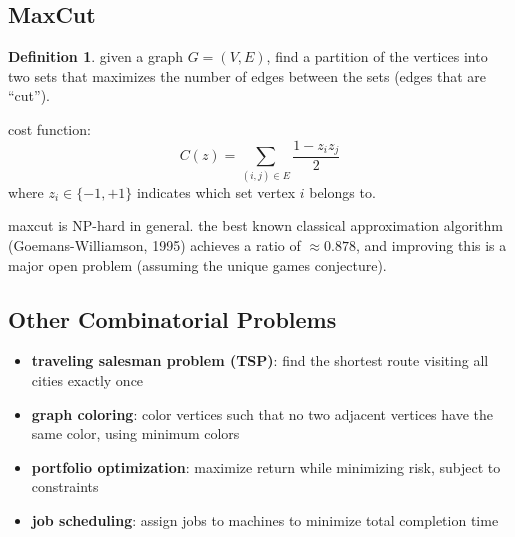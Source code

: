 \documentclass[11pt,a4paper]{article}
\theoremstyle{definition}
\newtheorem{definition}{Definition}[section]
\theoremstyle{remark}
\begin{document}
\subsection{MaxCut}

\begin{definition}
given a graph $G = (V, E)$, find a partition of the vertices into two sets that maximizes the number of edges between the sets (edges that are ``cut'').

cost function:
\[
C(z) = \sum_{(i,j) \in E} \frac{1 - z_i z_j}{2}
\]
where $z_i \in \{-1, +1\}$ indicates which set vertex $i$ belongs to.
\end{definition}

\begin{center}
\end{center}

maxcut is NP-hard in general. the best known classical approximation algorithm (Goemans-Williamson, 1995) achieves a ratio of $\approx 0.878$, and improving this is a major open problem (assuming the unique games conjecture).

\subsection{Other Combinatorial Problems}

\begin{itemize}
    \item \textbf{traveling salesman problem (TSP)}: find the shortest route visiting all cities exactly once
    \item \textbf{graph coloring}: color vertices such that no two adjacent vertices have the same color, using minimum colors
    \item \textbf{portfolio optimization}: maximize return while minimizing risk, subject to constraints
    \item \textbf{job scheduling}: assign jobs to machines to minimize total completion time
\end{itemize}
\end{document}

